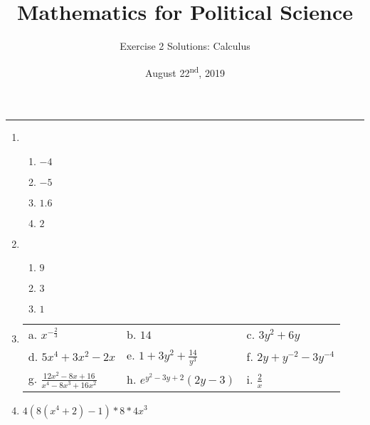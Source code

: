 \documentclass[11pt]{article}
\title{\Large{\bf{\vspace{-100pt}Mathematics for Political Science \vspace{-15pt}}}}
\author{\large{Exercise 2 Solutions: Calculus }}
\date{August 22\textsuperscript{nd}, 2019}
\begin{document}
\maketitle

\hrule

\vspace{.5cm}

\begin{enumerate}



\item  
\begin{enumerate}
\item $-4$
\item $-5$
\item $1.6$
\item $2$
\end{enumerate}

\vspace{.5cm}

\item 
\begin{enumerate}
\item $9$
\item $3$
\item $1$
\end{enumerate}

\vspace{.5cm}

\item 
\begin{center}
\begin{tabular}{p{4cm}p{4cm}p{4cm}}
a. $x^{-\frac{2}{3}}$            &  b. $14$                          & c. $3y^2 + 6y$              \rule{0cm}{1cm}\\
d. $5x^4 + 3x^2 - 2x$            &  e. $1 + 3y^2 + \frac{14}{y^3}$   & f. $2y + y^{-2} - 3y^{-4}$               \rule{0cm}{1cm}\\
g. $\frac{12x^2 - 8x + 16}{x^4 - 8x^3 + 16x^2}$ & h. $e^{y^2 - 3y + 2} (2y-3)$   & i. $\frac{2}{x}$ \rule{0cm}{1cm}\\
\end{tabular}
\end{center}

\vspace{.5cm}

\item  $4(8(x^4+2)-1)*8*4x^3$

\vspace{.5cm}





\end{enumerate}
\end{document}
